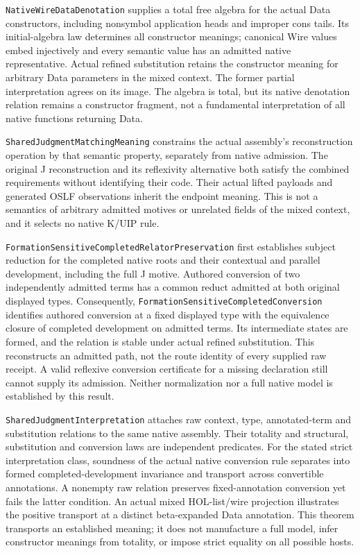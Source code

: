 \documentclass[11pt]{article}
\theoremstyle{definition}
\theoremstyle{remark}
\begin{document}
\nolinkurl{NativeWireDataDenotation} supplies a total free algebra for the
actual Data constructors, including nonsymbol application heads and improper
cons tails. Its initial-algebra law determines all constructor meanings;
canonical Wire values embed injectively and every semantic value has an
admitted native representative. Actual refined substitution retains the
constructor meaning for arbitrary Data parameters in the mixed context.
The former partial interpretation agrees on its image. The algebra is total,
but its native denotation relation remains a constructor fragment, not a
fundamental interpretation of all native functions returning Data.

\texttt{SharedJudgmentMatchingMeaning} constrains the actual assembly's
reconstruction operation by that semantic property, separately from native
admission. The original J reconstruction and its reflexivity alternative
both satisfy the combined requirements without identifying their code.
Their actual lifted payloads and generated OSLF observations inherit the
endpoint meaning. This is not a semantics of arbitrary admitted motives or
unrelated fields of the mixed context, and it selects no native K/UIP rule.

\nolinkurl{FormationSensitiveCompletedRelatorPreservation} first establishes
subject reduction for the completed native roots and their contextual and
parallel development, including the full J motive. Authored conversion of
two independently admitted terms has a common reduct admitted at both
original displayed types. Consequently,
\nolinkurl{FormationSensitiveCompletedConversion} identifies authored
conversion at a fixed displayed type with the equivalence closure of
completed development on admitted terms. Its intermediate states are formed,
and the relation is stable under actual refined substitution. This
reconstructs an admitted path, not the route identity of every supplied raw
receipt. A valid reflexive conversion certificate for a missing declaration
still cannot supply its admission. Neither normalization nor a full native
model is established by this result.

\nolinkurl{SharedJudgmentInterpretation} attaches raw context, type,
annotated-term and substitution relations to the same native assembly.
Their totality and structural, substitution and conversion laws are independent
predicates. For the stated strict interpretation class, soundness of the
actual native conversion rule separates into formed completed-development
invariance and transport across convertible annotations. A nonempty raw
relation preserves fixed-annotation conversion yet fails the latter condition.
An actual mixed HOL-list/wire projection illustrates the positive transport
at a distinct beta-expanded Data annotation. This theorem transports an
established meaning; it does not manufacture a full model, infer constructor
meanings from totality, or impose strict equality on all possible hosts.
\end{document}
